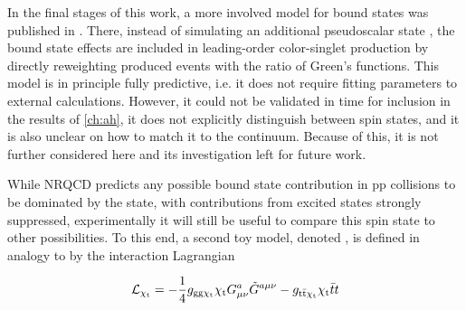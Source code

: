 In the final stages of this work, a more involved model for \ttbar bound states was published in . There, instead of simulating an additional pseudoscalar state \etat, the bound state effects are included in leading-order color-singlet \ttbar production by directly reweighting produced events with the ratio of Green's functions. This model is in principle fully predictive, i.e. it does not require fitting parameters to external calculations. However, it could not be validated in time for inclusion in the results of \cref{ch:ah}, it does not explicitly distinguish between \ttbar spin states, and it is also unclear on how to match it to the \ttbar continuum. Because of this, it is not further considered here and its investigation left for future work.

While NRQCD predicts any possible \ttbar bound state contribution in pp collisions to be dominated by the  state, with contributions from excited states strongly suppressed, experimentally it will still be useful to compare this spin state to other possibilities. To this end, a second toy model, denoted \chit, is defined in analogy to \etat by the interaction Lagrangian

\begin{equation}
  \mathcal{L}_{\mathrm{\chi_t}} = - \frac{1}{4} g_{\mathrm{gg} \mathrm{\chi_t}} \mathrm{\chi_t} G^{a}_{\mu \nu} \tilde{G}^{a \mu \nu} - g_{\mathrm{t \bar{t}} \mathrm{\chi_t}} \mathrm{\chi_t} \bar{t} t
\end{equation}

